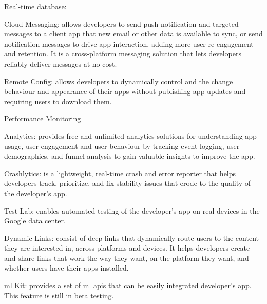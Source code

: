 % 
% 


\item Real-time database:


\item Cloud Messaging: allows developers to send push notification and targeted messages to a
client app that new email or other data is available to sync, or send notification messages to drive app
interaction, adding more user re-engagement and retention. It is a cross-platform messaging solution that lets
developers reliably deliver messages at no cost.
\item Remote Config: allows developers to dynamically control and the change behaviour and appearance of their apps
without publishing app updates and requiring users to download them.
\item Performance Monitoring
\item Analytics: provides free and unlimited analytics solutions for understanding app usage, user engagement and
user behaviour by tracking event logging, user demographics, and funnel analysis to gain valuable insights to
improve the app.
\item Crashlytics: is a lightweight, real-time crash and error reporter that helps developers track, prioritize,
and fix stability issues that erode to the quality of the developer's app.
\item Test Lab: enables automated testing of the developer's app on real devices in the Google data center.
\item Dynamic Links: consist of deep links that dynamically route users to the content they are interested in,
across platforms and devices. It helps developers create and share links that work the way they want, on the
platform they want, and whether users have their apps installed.
\item \acrshort{ml} Kit: provides a set of \acrshort{ml} \acrshort{api}s that can be easily integrated developer's app.
This feature is still in beta testing.


